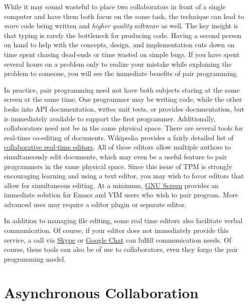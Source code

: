 \documentclass[]{article}
\begin{document}
While it may sound wasteful to place two collaborators in front of a single
computer and have them both focus on the same task, the technique can lead to
\emph{more} code being written and \emph{higher quality} software as well. The
key insight is that typing is rarely the bottleneck for producing code. Having
a second person on hand to help with the concepts, design, and implementation
cuts down on time spent chasing dead-ends or time wasted on simple bugs.
If you have spent several hours on a problem only to realize your mistake
while explaining the problem to someone, you will see the immediate benefits
of pair programming. 

In practice, pair programming need not have both subjects staring at the same
screen at the same time. One programmer may be writing code, while the other
looks into API documentation, writes unit tests, or provides documentation,
but is immediately available to support the first programmer. Additionally,
collaborators need not be in the same physical space. There are several tools
for real-time co-editing of documents. Wikipedia provides a fairly detailed
list of \href{http://en.wikipedia.org/wiki/Collaborative_real-time_editor}
{collaborative real-time
editors}. All of these editors allow multiple authors to simultaneously edit
documents, which may even be a useful feature to pair programmers in the same
physical space. Since this issue of TPM is strongly encouraging learning and
using a text editor, you may wish to favor editors that allow for simultaneous
editing. At a minimum, \href{http://www.gnu.org/software/screen/}{GNU Screen}
provides an immediate solution for Emacs and VIM users who wish to pair program.
More advanced uses may require a editor plugin or separate editor.

In addition to managing file editing, some real time editors also facilitate
verbal communication. Of course, if your editor does not immediately provide
this service, a call via \href{http://www.skype.com}{Skype} or
\href{http://chat.google.com}{Google Chat} can fulfill communication needs. Of
course, these tools can also be of use to collaborators, even they forgo the
pair programming model.

\section{Asynchronous Collaboration}
\end{document}
